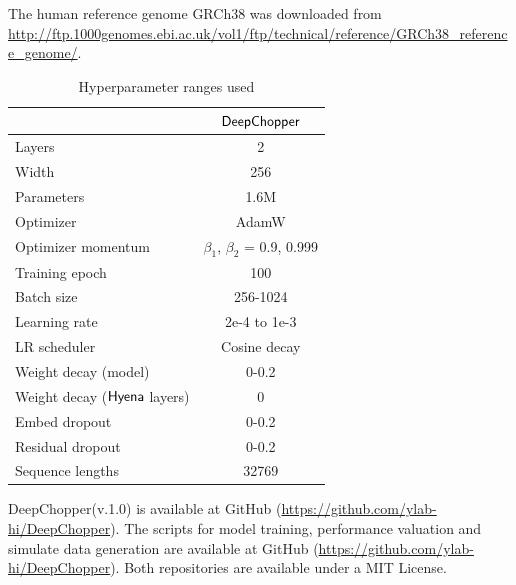 \documentclass[pdflatex, sn-mathphys-num, lineno]{sn-jnl}%
\newcommand{\chopper}{DeepChopper\xspace}
\theoremstyle{thmstyleone}%
\theoremstyle{thmstyletwo}%
\theoremstyle{thmstylethree}%
\begin{document}
The human reference genome GRCh38 was downloaded from \url{http://ftp.1000genomes.ebi.ac.uk/vol1/ftp/technical/reference/GRCh38\_reference\_genome/}.


\begin{table}
	\small
	\centering
	\caption{Hyperparameter ranges used}
	\vspace{10pt}
	\begin{tabular}{lc}
		\toprule
		                                    & {$\sf \chopper$}                  \\
		\midrule
		Layers                              & 2                                 \\
		Width                               & 256                               \\
		Parameters                          & 1.6M                              \\
		Optimizer                           & AdamW                             \\
		Optimizer momentum                  & $\beta_1$, $\beta_2$ = 0.9, 0.999 \\
		Training epoch                      & 100                               \\
		Batch size                          & 256-1024                          \\
		Learning rate                       & 2e-4 to 1e-3                      \\
		LR scheduler                        & Cosine decay                      \\
		Weight decay (model)                & 0-0.2                             \\
		Weight decay ({$\sf Hyena$} layers) & 0                                 \\
		Embed dropout                       & 0-0.2                             \\
		Residual dropout                    & 0-0.2                             \\
		Sequence lengths                    & 32769                             \\
		\midrule
	\end{tabular}
	\label{tab:nucleotideTRX_hyperparameter}
\end{table}



\chopper (v.1.0) is available at GitHub (\url{https://github.com/ylab-hi/DeepChopper}).
The scripts for model training, performance valuation and simulate data generation are available at GitHub (\url{https://github.com/ylab-hi/DeepChopper}).
Both repositories are available under a MIT License.
\end{document}
